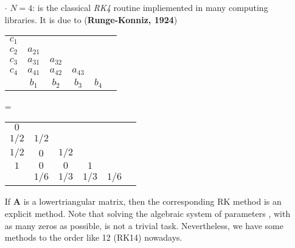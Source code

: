 \documentclass[a4paper, 11pt]{article}
\begin{document}
\begin{itemize}
	\item[$\cdot$] $N=4$: is the classical \emph{RK4} routine impliemented in many computing libraries. It is due to (\textbf{Runge-Konniz, 1924})
	\begin{center}
		\begin{tabular}{c|ccccc}
		$c_1$ \\
		$c_2$ & $a_{21}$ \\
		$c_3$ & $a_{31}$ & $a_{32}$\\
		$c_4$ & $a_{41}$ & $a_{42}$ & $a_{43}$\\
		\hline
		 & $b_1$ & $b_2$ & $b_3$ & $b_4$
		\end{tabular}  = 
		\begin{tabular}{c|ccccc}
		$0$ \\
		$1/2$ & $1/2$ \\
		$1/2$ & $0$ & $1/2$\\
		$1$ & $0$ & $0$ & $1$\\
		\hline
		 & $1/6$ & $1/3$ & $1/3$ & $1/6$
		\end{tabular}
	\end{center}
	If $\bm{A}$ is a lowertriangular matrix, then the corresponding RK method is an explicit method. Note that solving the algebraic system of parameters , with as many zeros as possible, is not a trivial task. Nevertheless, we have some methods to the order like 12 (RK14) nowadays.
\end{itemize}
\end{document}
